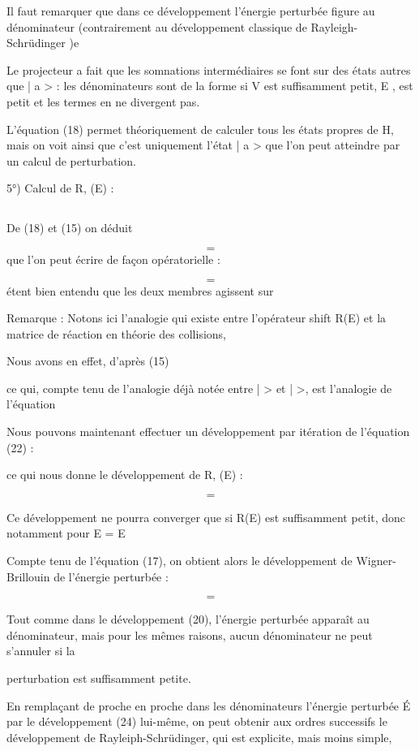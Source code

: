 Il faut remarquer que dans ce développement l'énergie perturbée figure au
dénominateur (contrairement au développement classique de Rayleigh-Schrüdinger )e

Le projecteur a fait que les somnations intermédiaires se font sur
des états autres que | a > : les dénominateurs sont de la forme  si
V est suffisamment petit, E , est petit et les termes en ne
divergent pas.

L'équation (18) permet théoriquement de calculer tous les états propres de H, mais on voit ainsi que c'est uniquement l'état | a > que l'on peut
atteindre par un calcul de perturbation.

5°) Calcul de R, (E) :

\subsection{}%
De (18) et (15) on déduit

\[
\tag{21}=
\]
que l'on peut écrire de façon opératorielle :

\[
\tag{22}=
\]
étent bien entendu que les deux membres agissent sur 


Remarque : Notons ici l'analogie qui existe entre l'opérateur shift R(E) et la
matrice de réaction en théorie des collisions,

Nous avons en effet, d'après (15)

ce qui, compte tenu de l'analogie déjà notée entre |  > et  |  >,
est l'analogie de l'équation

Nous pouvons maintenant effectuer un développement par itération de l'équation (22) :

ce qui nous donne le développement de R, (E) :

\[
\tag{23}=
\]

Ce développement ne pourra converger que si R(E) est suffisamment petit, donc
notamment pour E = E

Compte tenu de l'équation (17), on obtient alors le développement de
Wigner-Brillouin de l'énergie perturbée :

\[
\tag{24}=
\]

Tout comme dans le développement (20), l'énergie perturbée apparaît au dénominateur, mais pour les mêmes raisons, aucun dénominateur ne peut s'annuler si la

perturbation est suffisamment petite.

En remplaçant de proche en proche dans les dénominateurs l'énergie
perturbée É par le développement (24) lui-même, on peut obtenir aux ordres
successifs le développement de Rayleiph-Schrüdinger, qui est explicite, mais
moins simple,

